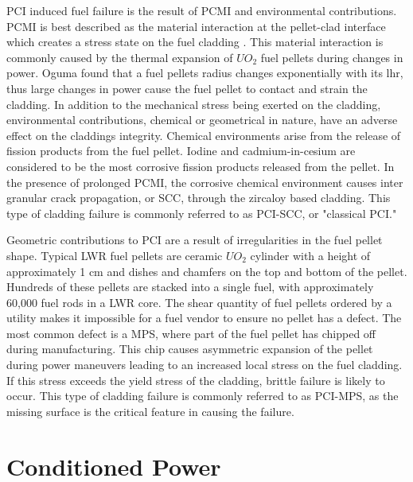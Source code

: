 \documentclass[edeposit,fullpage]{uiucthesis2009}
\begin{document}
\gls{PCI} induced fuel failure is the result of \gls{PCMI} and environmental contributions.
\gls{PCMI} is best described as the material interaction at the pellet-clad interface which creates a stress state on the fuel cladding \cite{kennard_pci_2016}.
This material interaction is commonly caused by the thermal expansion of $UO_2$ fuel pellets during changes in power.
Oguma \cite{oguma_cracking_1983} found that a fuel pellets radius changes exponentially with its \gls{lhr}, thus large changes in power cause the fuel pellet to contact and strain the cladding.
In addition to the mechanical stress being exerted on the cladding, environmental contributions, chemical or geometrical in nature, have an adverse effect on the claddings integrity.
Chemical environments arise from the release of fission products from the fuel pellet.
Iodine and cadmium-in-cesium are considered to be the most corrosive fission products released from the pellet. %
In the presence of prolonged \gls{PCMI}, the corrosive chemical environment causes inter granular crack propagation, or \gls{SCC}, through the zircaloy based cladding.
This type of cladding failure is commonly referred to as \gls{PCI}-\gls{SCC}, or "classical \gls{PCI}."

Geometric contributions to \gls{PCI} are a result of irregularities in the fuel pellet shape.
Typical \gls{LWR} fuel pellets are ceramic $UO_2$ cylinder with a height of approximately 1 cm and dishes and chamfers on the top and bottom of the pellet.
Hundreds of these pellets are stacked into a single fuel, with approximately 60,000 fuel rods in a \gls{LWR} core.
The shear quantity of fuel pellets ordered by a utility makes it impossible for a fuel vendor to ensure no pellet has a defect.
The most common defect is a \gls{MPS}, where part of the fuel pellet has chipped off during manufacturing.
This chip causes asymmetric expansion of the pellet during power maneuvers leading to an increased local stress on the fuel cladding. 
If this stress exceeds the yield stress of the cladding, brittle failure is likely to occur.
This type of cladding failure is commonly referred to as \gls{PCI}-\gls{MPS}, as the missing surface is the critical feature in causing the failure.






\section{Conditioned Power}
\end{document}
